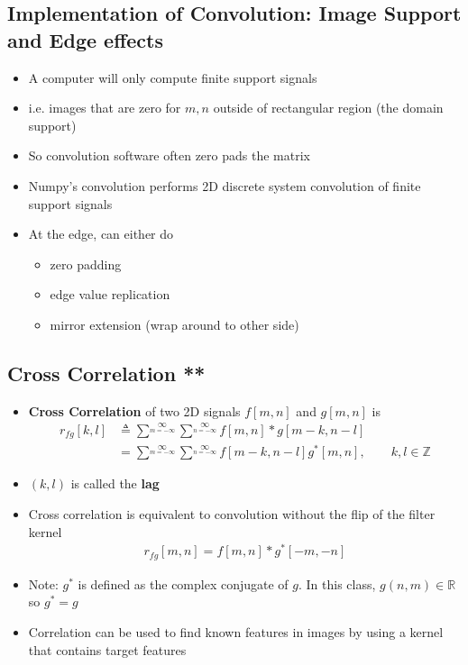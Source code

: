 \documentclass[letterpaper,12pt]{article}
\begin{document}
\subsection{Implementation of Convolution: Image Support and Edge effects}
\begin{itemize}
 \item A computer will only compute finite support signals
 \item i.e. images that are zero for $m,n$ outside of rectangular region (the domain support)
 \item So convolution software often zero pads the matrix
 \item Numpy's convolution performs 2D discrete system convolution of finite support signals
 \item At the edge, can either do
       \begin{itemize}
        \item zero padding
        \item edge value replication
        \item mirror extension (wrap around to other side)
       \end{itemize}
\end{itemize}

\subsection{Cross Correlation **}
\begin{itemize}
 \item \textbf{Cross Correlation} of two 2D signals $f[m,n]$ and $g[m,n]$ is
       \begin{align}
        r_{fg}[k,l] & \triangleq \sum\limits^{\infty}\limits_{m=-\infty} \sum\limits^{\infty}\limits_{n=-\infty} f[m,n] * g[m-k, n-l]                       \\
                    & = \sum\limits^{\infty}\limits_{m=-\infty} \sum\limits^{\infty}\limits_{n=-\infty} f[m-k,n-l]g^{*}[m,n], \quad\quad k,l \in \mathbb{Z}
       \end{align}
 \item $(k,l)$ is called the \textbf{lag}
 \item Cross correlation is equivalent to convolution without the flip of the filter kernel
       \begin{align}
        r_{fg}[m,n] = f[m,n] * g^{*}[-m, -n]
       \end{align}
 \item Note: $g^{*}$ is defined as the complex conjugate of $g$. In this class, $g(n,m) \in \mathbb{R}$ so $g^{*} = g$
 \item Correlation can be used to find known features in images by using a kernel that contains target features
\end{itemize}
\end{document}
